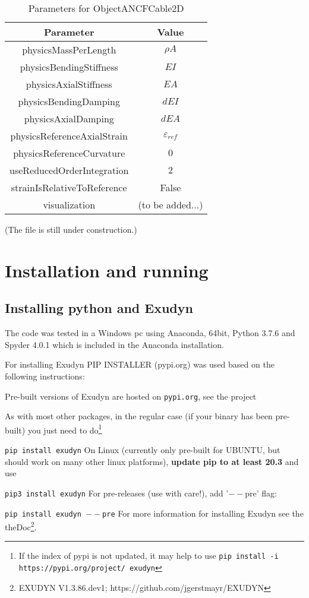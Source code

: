 \begin{table}
    \caption{Parameters for ObjectANCFCable2D} \label{tab:ObjectANCFCable2D}
    \centering
    \begin{tabular}{c|c} \hline
        Parameter & Value \\ \hline 
        physicsMassPerLength & $\rho A$\\
        physicsBendingStiffness & $EI$\\
        physicsAxialStiffness & $EA$\\
        physicsBendingDamping & $dEI$\\
        physicsAxialDamping & $dEA$\\
        physicsReferenceAxialStrain  & $\varepsilon_{ref}$\\
        physicsReferenceCurvature & $0$\\
        useReducedOrderIntegration & $2$\\
        strainIsRelativeToReference & False\\
        visualization & (to be added...)\\ \hline
    \end{tabular}
\end{table}
\ei
(The file is still under construction.)
\section{Installation and running}
\subsection{Installing python and Exudyn}
The code was tested in a Windows pc using Anaconda, 64bit, Python 3.7.6 and Spyder 4.0.1 which is included in the Anaconda installation.

For installing Exudyn PIP INSTALLER (pypi.org) was used based on the following instructions:

Pre-built versions of Exudyn are hosted on \texttt{pypi.org}, see the project
\bi
 \item {}
\ei
As with most other packages, in the regular case (if your binary has been pre-built) you just need to do\footnote{If the index of pypi is not updated, it may help to use \texttt{pip install -i https://pypi.org/project/ exudyn} }
\bi
  \item[] \texttt{pip install exudyn}
\ei
On Linux (currently only pre-built for UBUNTU, but should work on many other linux platforms), {\bf update pip to at least 20.3} and use 
\bi
  \item[] \texttt{pip3 install exudyn}
\ei
For pre-releases (use with care!), add '$--$pre' flag:
\bi
  \item[] \texttt{pip install exudyn $--$pre}
\ei                 
For more information for installing Exudyn see the theDoc\footnote{EXUDYN V1.3.86.dev1; https://github.com/jgerstmayr/EXUDYN}.
